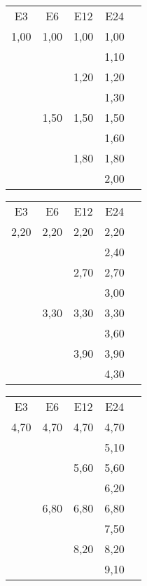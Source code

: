 \begin{tabular}{c@{ }c@{ }c@{ }c@{ }c}
E3   & E6   & E12  & E24  \\
1,00 & 1,00 & 1,00 & 1,00 \\
     &      &      & 1,10 \\
     &      & 1,20 & 1,20 \\
     &      &      & 1,30 \\
     & 1,50 & 1,50 & 1,50 \\
     &      &      & 1,60 \\
     &      & 1,80 & 1,80 \\
     &      &      & 2,00 \\
\end{tabular}
\begin{tabular}{c@{ }c@{ }c@{ }c@{ }c}
  E3 & E6   & E12  & E24  \\
2,20 & 2,20 & 2,20 & 2,20 \\
     &      &      & 2,40 \\
     &      & 2,70 & 2,70 \\
     &      &      & 3,00 \\
     & 3,30 & 3,30 & 3,30 \\
     &      &      & 3,60 \\
     &      & 3,90 & 3,90 \\
     &      &      & 4,30 \\
\end{tabular}
\begin{tabular}{c@{ }c@{ }c@{ }c@{ }c}
  E3 & E6   & E12  & E24  \\
4,70 & 4,70 & 4,70 & 4,70 \\
     &      &      & 5,10 \\
     &      & 5,60 & 5,60 \\
     &      &      & 6,20 \\
     & 6,80 & 6,80 & 6,80 \\
     &      &      & 7,50 \\
     &      & 8,20 & 8,20 \\
     &      &      & 9,10 \\
\end{tabular}
